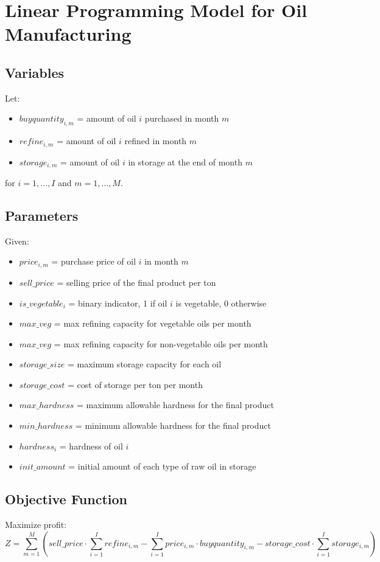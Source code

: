\documentclass{article}
\begin{document}
\section*{Linear Programming Model for Oil Manufacturing}

\subsection*{Variables}
Let:
\begin{itemize}
    \item $buyquantity_{i,m}$ = amount of oil $i$ purchased in month $m$
    \item $refine_{i,m}$ = amount of oil $i$ refined in month $m$
    \item $storage_{i,m}$ = amount of oil $i$ in storage at the end of month $m$
\end{itemize}
for $i = 1, \ldots, I$ and $m = 1, \ldots, M$.

\subsection*{Parameters}
Given:
\begin{itemize}
    \item $price_{i,m}$ = purchase price of oil $i$ in month $m$
    \item $sell\_price$ = selling price of the final product per ton
    \item $is\_vegetable_{i}$ = binary indicator, 1 if oil $i$ is vegetable, 0 otherwise
    \item $max\_veg$ = max refining capacity for vegetable oils per month
    \item $max\_veg$ = max refining capacity for non-vegetable oils per month
    \item $storage\_size$ = maximum storage capacity for each oil
    \item $storage\_cost$ = cost of storage per ton per month
    \item $max\_hardness$ = maximum allowable hardness for the final product
    \item $min\_hardness$ = minimum allowable hardness for the final product
    \item $hardness_{i}$ = hardness of oil $i$
    \item $init\_amount$ = initial amount of each type of raw oil in storage
\end{itemize}

\subsection*{Objective Function}
Maximize profit:
\[
Z = \sum_{m=1}^{M}\left( sell\_price \cdot \sum_{i=1}^{I} refine_{i,m} - \sum_{i=1}^{I} price_{i,m} \cdot buyquantity_{i,m} - storage\_cost \cdot \sum_{i=1}^{I} storage_{i,m} \right)
\]
\end{document}
